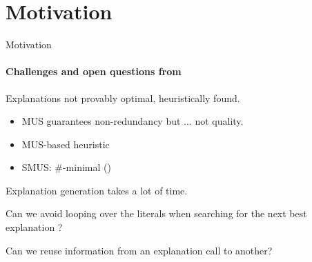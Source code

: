 \documentclass{beamer}
\renewcommand\emph[1]{{\color{vuborange}#1}}
\begin{document}
%	


%	
%		

%	
%	

\section{Motivation}
	\begin{frame}{Motivation}
		\framesubtitle{Challenges and open questions from \cite{bogaerts2020step}}

		\begin{description}[font=\color{vuborange}\itshape]
			\small
			\item[Optimality] Explanations not provably optimal, \emph{heuristically} found.
			\begin{itemize}
				\item MUS guarantees non-redundancy but ... not quality.
				\item MUS-based heuristic
				\item SMUS: $\#$-minimal (\cite{ignatiev2015smallest})
			\end{itemize} \pause
			\item[Efficiency] Explanation generation takes a lot of time. \pause
			\item[Constrainedness] Can we avoid looping over the literals when searching for the next best explanation ?\pause
			\item[Incrementality] Can we reuse information from an explanation call to another? 
		\end{description}
	\end{frame}
\end{document}
